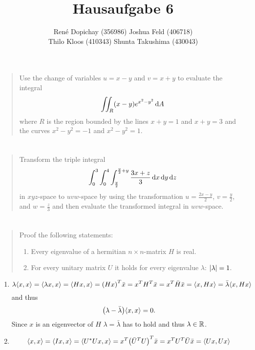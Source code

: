 \documentclass{exercise}
\title{Hausaufgabe 6}
\author{René Dopichay (356986) \quad Joshua Feld (406718)\\Thilo Kloos (410343) \quad Shunta Takushima (430043)}
\begin{document}
	\maketitle


	\section{}

	\begin{quote}
		Use the change of variables \(u = x - y\) and \(v = x + y\) to evaluate the integral
		\begin{equation}
			\iint_R \parentheses*{x - y}e^{x^2 - y^2}\d A
		\end{equation}
		where \(R\) is the region bounded by the lines \(x + y = 1\) and \(x + y = 3\) and the curves \(x^2 - y^2 = -1\) and \(x^2 - y^2 = 1\).
	\end{quote}


	\section{}

	\begin{quote}
		Transform the triple integral
		\begin{equation}
			\int_0^3 \int_0^4 \int_{\frac{y}{2}}^{\frac{y}{2} + y}\frac{3x + z}{3}\d x\d y\d z
		\end{equation}
		in \(xyz\)-space to \(uvw\)-space by using the transformation \(u = \frac{2x - y}{2}\), \(v = \frac{y}{2}\), and \(w = \frac{z}{3}\) and then evaluate the transformed integral in \(uvw\)-space.
	\end{quote}


	\section{}

	\begin{quote}
		Proof the following statements:
		\begin{enumerate}
			\item Every eigenvalue of a hermitian \(n \times n\)-matrix \(H\) is real.
			\item For every unitary matrix \(U\) it holds for every eigenvalue \(\lambda\): \(\absolute*{\lambda} = 1\).
		\end{enumerate}
	\end{quote}

	\begin{enumerate}
		\item
		\[
			\lambda\angles*{x, x} = \angles*{\lambda x, x} = \angles*{Hx, x} = \parentheses*{Hx}^T \bar{x} = x^T H^T \bar{x} = x^T \bar{H}\bar{x} = \angles*{x, Hx} = \bar{\lambda}\angles*{x, Hx}
		\]
		and thus
		\[
			\parentheses*{\lambda - \bar{\lambda}}\angles*{x, x} = 0.
		\]
		Since \(x\) is an eigenvector of \(H\) \(\lambda = \bar{\lambda}\) has to hold and thus \(\lambda \in \R\).
		\item
		\[
			\angles*{x, x} = \angles*{Ix, x} = \angles*{U^* Ux, x} = x^T \parentheses*{\bar{U}^T U}^T \bar{x} = x^T U^T \bar{U}\bar{x} = \angles*{Ux, Ux}
		\]
	\end{enumerate}
\end{document}
